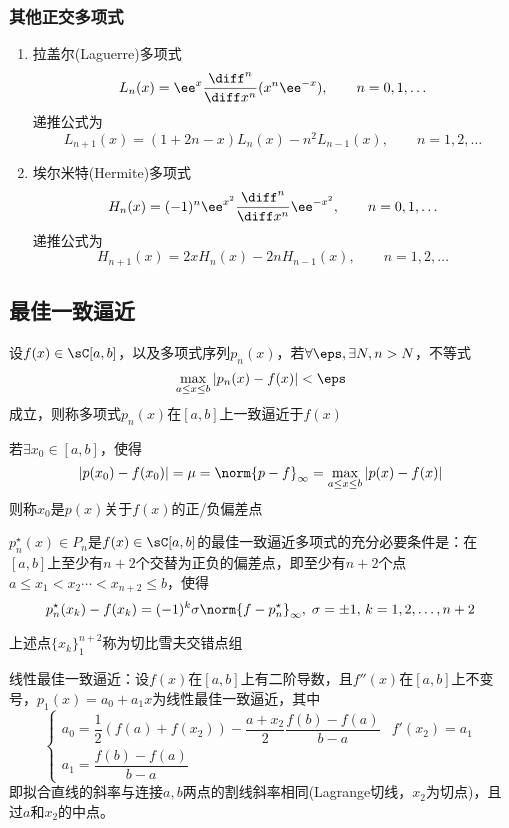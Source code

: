 \subsubsection{其他正交多项式}
\begin{enumerate}
    \item 拉盖尔(Laguerre)多项式
    \[L_n(x)=\ee^x\frac{\diff^n}{\diff x^n}(x^n\ee^{-x}),\qquad n=0,1,\ldots\]
    递推公式为
    \[L_{n+1}(x)=(1+2n-x)L_n(x)-n^2L_{n-1}(x),\qquad n=1,2,\ldots\]
    \item 埃尔米特(Hermite)多项式
    \[H_n(x)=(-1)^n\ee^{x^2}\frac{\diff^n}{\diff x^n}\ee^{-x^2},\qquad n=0,1,\ldots\]
    递推公式为
    \[H_{n+1}(x)=2xH_n(x)-2nH_{n-1}(x),\qquad n=1,2,\ldots\]
\end{enumerate}

\subsection{最佳一致逼近}
\begin{definition}
    设$f(x)\in\sC[a,b]$，以及多项式序列$p_n(x)$，若$\forall\eps,\exists N, n> N$，不等式
    \[\max_{a\leq x\leq b}|p_n(x)-f(x)|<\eps\]
    成立，则称多项式$p_n(x)$在$[a,b]$上一致逼近于$f(x)$
\end{definition}
\begin{definition}
    若$\exists x_0\in[a,b]$，使得
    \[|p(x_0)-f(x_0)|=\mu=\norm{p-f}_\infty=\max_{a\leq x\leq b}|p(x)-f(x)|\]
    则称$x_0$是$p(x)$关于$f(x)$的正/负偏差点
\end{definition}
\begin{theorem}[Chebyshev]
    $p_n^\star(x)\in P_n$是$f(x)\in\sC[a,b]$的最佳一致逼近多项式的充分必要条件是：在$[a,b]$上至少有$n+2$个交替为正负的偏差点，即至少有$n+2$个点$a\leq x_1<x_2\cdots<x_{n+2}\leq b$，使得
    \[p_n^\star(x_k)-f(x_k)=(-1)^k\sigma\norm{f-p_n^\star}_\infty,\;\sigma=\pm 1,\,k=1,2,\ldots,n+2\]
\end{theorem}
上述点$\{x_k\}_1^{n+2}$称为切比雪夫交错点组

线性最佳一致逼近：设$f(x)$在$[a,b]$上有二阶导数，且$f''(x)$在$[a,b]$上不变号，$p_1(x)=a_0+a_1x$为线性最佳一致逼近，其中
\[\begin{cases}
    a_0=\dfrac{1}{2}(f(a)+f(x_2))-\dfrac{a+x_2}{2}\dfrac{f(b)-f(a)}{b-a} & f'(x_2)=a_1\\
    a_1=\dfrac{f(b)-f(a)}{b-a}
\end{cases}\]
即拟合直线的斜率与连接$a,b$两点的割线斜率相同(Lagrange切线，$x_2$为切点)，且过$a$和$x_2$的中点。

